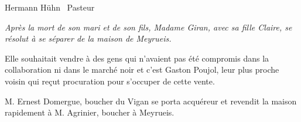 \begin{flushright}
Hermann Hühn \ Pasteur
\end{flushright}

\vspace{1.5em}

\begin{tcolorbox}[colback=white,colframe=black]
\itshape
Après la mort de son mari et de son fils, Madame Giran, avec sa fille Claire, se résolut à
se séparer de la maison de Meyrueis.

Elle souhaitait vendre à des gens qui n’avaient pas été compromis dans la collaboration
ni dans le marché noir et c’est Gaston Poujol, leur plus proche voisin qui
reçut procuration pour s’occuper de cette vente.

M. Ernest Domergue, boucher du Vigan se porta acquéreur et revendit la maison
rapidement à M. Agrinier, boucher à Meyrueis.
\end{tcolorbox}

